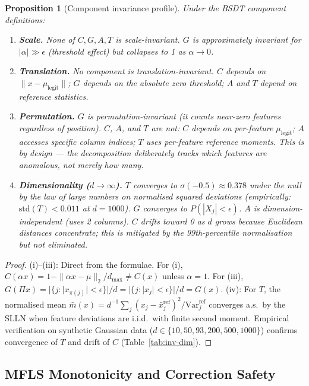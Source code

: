 \documentclass[journal]{IEEEtran}
\newtheorem{proposition}{Proposition}
\begin{document}
\begin{proposition}[Component invariance profile]
\label{prop:component-invariance}
Under the BSDT component definitions:
\begin{enumerate}[label=(\roman*)]
    \item \textbf{Scale.}\; None of $C, G, A, T$ is scale-invariant.  $G$ is approximately invariant for $|\alpha| \gg \epsilon$ (threshold effect) but collapses to 1 as $\alpha \to 0$.
    \item \textbf{Translation.}\; No component is translation-invariant.  $C$ depends on $\|x - \mu_\text{legit}\|$; $G$ depends on the absolute zero threshold; $A$ and $T$ depend on reference statistics.
    \item \textbf{Permutation.}\; $G$ is permutation-invariant (it counts near-zero features regardless of position).  $C$, $A$, and $T$ are not: $C$ depends on per-feature $\mu_\text{legit}$; $A$ accesses specific column indices; $T$ uses per-feature reference moments.  This is by design --- the decomposition deliberately tracks \emph{which} features are anomalous, not merely \emph{how many}.
    \item \textbf{Dimensionality ($d \to \infty$).}\; $T$ converges to $\sigma(-0.5) \approx 0.378$ under the null by the law of large numbers on normalised squared deviations (empirically: $\text{std}(T) < 0.011$ at $d = 1000$).  $G$ converges to $P(|X_j| < \epsilon)$.  $A$ is dimension-independent (uses 2 columns).  $C$ drifts toward 0 as $d$ grows because Euclidean distances concentrate; this is mitigated by the 99th-percentile normalisation but not eliminated.
\end{enumerate}
\end{proposition}

\begin{proof}
(i)--(iii): Direct from the formulae.  For (i), $C(\alpha x) = 1 - \|\alpha x - \mu\|_2 / d_{\max} \neq C(x)$ unless $\alpha = 1$.  For (iii), $G(\Pi x) = |\{j : |x_{\pi(j)}| < \epsilon\}|/d = |\{j : |x_j| < \epsilon\}|/d = G(x)$.  (iv): For $T$, the normalised mean $\bar{m}(x) = d^{-1} \sum_j (x_j - \bar{x}_j^{\text{ref}})^2 / \text{Var}_j^{\text{ref}}$ converges a.s.\ by the SLLN when feature deviations are i.i.d.\ with finite second moment.  Empirical verification on synthetic Gaussian data ($d \in \{10, 50, 93, 200, 500, 1000\}$) confirms convergence of $T$ and drift of $C$ (Table~\ref{tab:inv-dim}).
\end{proof}

\subsection{MFLS Monotonicity and Correction Safety}
\end{document}
